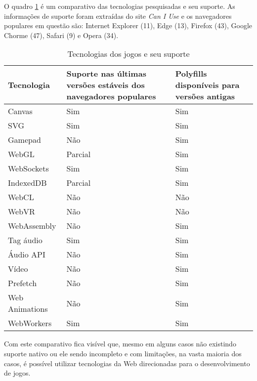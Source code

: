 O quadro \ref{table:technologies} é um comparativo das
tecnologias pesquisadas e seu suporte. As
informações de suporte foram extraídas do site \textit{Can I Use} e
os navegadores populares em questão são: Internet Explorer (11), Edge
(13), Firefox (43), Google Chorme (47), Safari (9) e Opera (34).

\begin{table}
\begin{tabular}{ |p{3cm}|p{3cm}|p{3cm}|  }
\hline
Tecnologia & Suporte nas últimas versões estáveis dos navegadores populares & Polyfills disponíveis  para versões antigas \\ \hline
Canvas & Sim & Sim \\ \hline
SVG & Sim & Sim \\ \hline
Gamepad & Não & Sim \\ \hline
WebGL & Parcial & Sim \\ \hline
WebSockets & Sim & Sim \\ \hline
IndexedDB & Parcial & Sim \\ \hline
WebCL & Não & Não \\ \hline
WebVR & Não & Não \\ \hline
WebAssembly & Não & Sim \\ \hline
Tag áudio & Sim & Sim \\ \hline
Áudio API & Não & Sim \\ \hline
Vídeo & Não & Sim \\ \hline
Prefetch & Não & Sim \\ \hline
Web Animations & Não & Sim \\ \hline
WebWorkers & Sim & Sim\\ \hline
\end{tabular}
\label{table:technologies}
\caption{Tecnologias dos jogos e seu suporte}
\end{table}

Com este comparativo fica visível que, mesmo em alguns casos não
existindo suporte nativo ou ele sendo incompleto e com limitações,
na vasta maioria dos casos, é possível utilizar tecnologias da Web
direcionadas para o desenvolvimento de jogos.

\newpage

